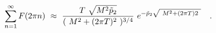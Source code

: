 \begin{equation}
\sum _{n=1}^{\infty} F(2\pi n)~ \approx ~\frac{T~ \sqrt {M^2\tilde p_2}}
{(~M^2 + (2\pi T)^2~)^{3/4}}~ e^{-\tilde p_2 \sqrt {~M^2 + (2\pi T)2~}}~~~.\\
\end{equation}

